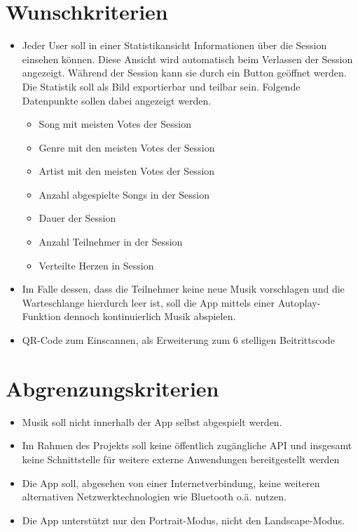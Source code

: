 \documentclass[oneside, ngerman]{sdqtechreport}
\begin{document}
\section{Wunschkriterien}
\label{sec:Zielbestimmungen:Wunschkriterien}

\begin{itemize}
    \item Jeder User soll in einer Statistikansicht Informationen über die Session einsehen können. Diese Ansicht wird automatisch beim Verlassen der Session angezeigt. Während der Session kann sie durch ein Button geöffnet werden. Die Statistik soll als Bild exportierbar und teilbar sein. 
    Folgende Datenpunkte sollen dabei angezeigt werden. 
    \begin{itemize}
        \item Song mit meisten Votes der Session
        \item Genre mit den meisten Votes der Session
        \item Artist mit den meisten Votes der Session
        \item Anzahl abgespielte Songs in der Session
        \item Dauer der Session
        \item Anzahl Teilnehmer in der Session 
        \item Verteilte Herzen in Session
    \end{itemize}
  
    \item Im Falle dessen, dass die Teilnehmer keine neue Musik vorschlagen und die Warteschlange hierdurch leer ist, soll die App mittels einer Autoplay-Funktion dennoch kontinuierlich Musik abspielen.
    \item QR-Code zum Einscannen, als Erweiterung zum 6 stelligen Beitrittscode

\end{itemize}

\section{Abgrenzungskriterien}
\label{sec:Zielbestimmungen:Abgrenzungskriterien}
\begin{itemize}
    \item Musik soll nicht innerhalb der App selbst abgespielt werden.
    \item Im Rahmen des Projekts soll keine öffentlich zugängliche API und insgesamt keine Schnittstelle für weitere externe Anwendungen bereitgestellt werden
    \item Die App soll, abgesehen von einer Internetverbindung, keine weiteren alternativen Netzwerktechnologien wie Bluetooth o.ä. nutzen.
    \item Die App unterstützt nur den Portrait-Modus, nicht den Landscape-Modus.

\end{itemize}
\end{document}
